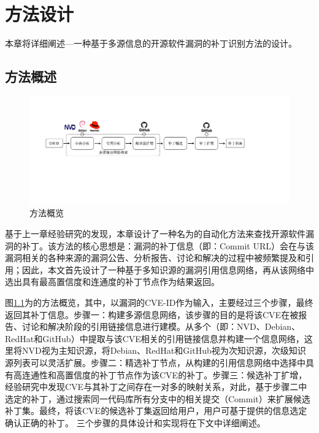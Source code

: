 
\chapter{\tool 方法设计}

本章将详细阐述\tool ---一种基于多源信息的开源软件漏洞的补丁识别方法的设计。

\section{方法概述}
\begin{figure}[h]
    \centering
    \includegraphics[scale=0.40]{res/overview.pdf}
    \caption{\tool 方法概览}\label{fig:overview}
\end{figure}

基于上一章经验研究的发现，本章设计了一种名为\tool 的自动化方法来查找开源软件漏洞的补丁。该方法的核心思想是：漏洞的补丁信息（即：Commit URL）会在与该漏洞相关的各种来源的漏洞公告、分析报告、讨论和解决的过程中被频繁提及和引用；因此，本文首先设计了一种基于多知识源的漏洞引用信息网络，再从该网络中选出具有最高置信度和连通度的补丁节点作为结果返回。

图\ref{fig:overview}为\tool 的方法概览，其中，\tool 以漏洞的CVE-ID作为输入，主要经过三个步骤，最终返回其补丁信息。步骤一：构建多源信息网络，该步骤的目的是将该CVE在被报告、讨论和解决阶段的引用链接信息进行建模。\tool 从多个（即：NVD、Debian\cite{debian}、RedHat\cite{redhat}和GitHub）中提取与该CVE相关的引用链接信息并构建一个信息网络，这里将NVD视为主知识源，将Debian、RedHat和GitHub视为次知识源，次级知识源列表可以灵活扩展。步骤二：精选补丁节点，\tool 从构建的引用信息网络中选择中具有高连通性和高置信度的补丁节点作为该CVE的补丁。步骤三：候选补丁扩增， 经验研究中发现CVE与其补丁之间存在一对多的映射关系，对此，基于步骤二中选定的补丁，\tool 通过搜索同一代码库所有分支中的相关提交（Commit）来扩展候选补丁集。最终，\tool 将该CVE的候选补丁集返回给用户，用户可基于\tool 提供的信息选定确认正确的补丁。%
三个步骤的具体设计和实现将在下文中详细阐述。

